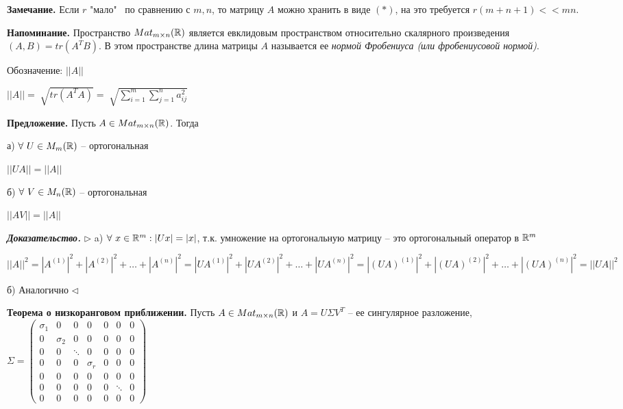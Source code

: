 \vspace{\baselineskip}
\textbf{Замечание.} Если $r$ "мало" \ по сравнению с $m, n$, то матрицу $A$ можно хранить в виде $(*)$, на это требуется $r(m + n + 1) << mn$.

\vspace{\baselineskip}
\textbf{Напоминание.} Пространство $Mat_{m \times n} (\mathbb{R})$ является евклидовым пространством относительно скалярного произведения $(A, B) = tr(A^T B)$. В этом пространстве длина матрицы $A$ называется ее \textit{нормой Фробениуса (или фробениусовой нормой)}.

Обозначение: $||A||$

$||A|| = \sqrt[]{tr(A^T A)} = \sqrt[]{\sum\limits_{i=1}^m \sum\limits_{j=1}^n a_{ij}^2}$

\vspace{\baselineskip}
\textbf{Предложение.} Пусть $A \in Mat_{m \times n} (\mathbb{R})$. Тогда

а) $\forall \ U \in M_m(\mathbb{R})$ -- ортогональная

$||UA|| = ||A||$

б) $\forall \ V \in M_n(\mathbb{R})$ -- ортогональная

$||AV|| = ||A||$

\vspace{\baselineskip}
\textbf{\textit{Доказательство.}} $\rhd$ a) $\forall \ x \in \mathbb{R}^m: |Ux| = |x|$, т.к. умножение на ортогональную матрицу -- это ортогональный оператор в $\mathbb{R}^m$

$||A||^2 = |A^{(1)}|^2 + |A^{(2)}|^2 + \dots + |A^{(n)}|^2 = |UA^{(1)}|^2 + |UA^{(2)}|^2 + \dots + |UA^{(n)}|^2 = |(UA)^{(1)}|^2 + |(UA)^{(2)}|^2 + \dots + |(UA)^{(n)}|^2 = ||UA||^2$

б) Аналогично $\lhd$

\vspace{\baselineskip}
\textbf{Теорема о низкоранговом приближении.} Пусть $A \in Mat_{m \times n} (\mathbb{R})$ и $A = U \Sigma V^T$ -- ее сингулярное разложение, $\Sigma = \begin{pmatrix} \sigma_1 & 0 & 0 & 0 & 0 & 0 & 0 \\  0 & \sigma_2 & 0 & 0 & 0 & 0 & 0 \\ 0 & 0 & \ddots & 0 & 0 & 0 & 0 \\ 0 & 0 & 0 & \sigma_r & 0 & 0 & 0 \\ 0 & 0 & 0 & 0 & 0 & 0 & 0 \\ 0 & 0 & 0 & 0 & 0 & \ddots & 0 \\ 0 & 0 & 0 & 0 & 0 & 0 & 0 \end{pmatrix}$

